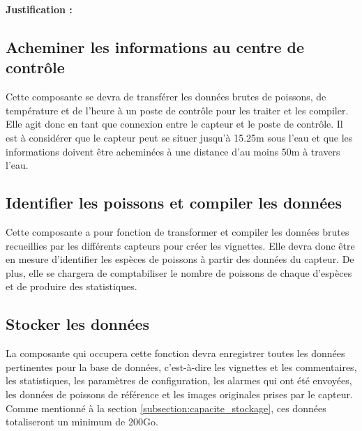  \textbf{Justification :}
 
 \begin{table}[!htb]
\footnotesize
\centering
{}
\caption{Évaluation globale des concepts pour l'alimentation du système}
\label{t:Decision_alimenter}
\end{table}

\subsection{Acheminer les informations au centre de contrôle}
Cette composante se devra de transférer les données brutes de poissons, de température et de l'heure à un poste de contrôle pour les traiter et les compiler. Elle agit donc en tant que connexion entre le capteur et le poste de contrôle. Il est à considérer que le capteur peut se situer jusqu'à 15.25m sous l'eau et que les informations doivent être acheminées à une distance d'au moins 50m à travers l'eau. 


\subsection{Identifier les poissons et compiler les données}
Cette composante a pour fonction de transformer et compiler les données brutes recueillies par les différents capteurs pour créer les vignettes. Elle devra donc être en mesure d'identifier les espèces de poissons à partir des données du capteur. De plus, elle se chargera de comptabiliser le nombre de poissons de chaque d'espèces et de produire des statistiques.


\subsection{Stocker les données}
La composante qui occupera cette fonction devra enregistrer toutes les données pertinentes pour la base de données, c'est-à-dire les vignettes et les commentaires, les statistiques, les paramètres de configuration, les alarmes  qui ont été envoyées, les données de poissons de référence et les images originales prises par le capteur.
Comme mentionné à la section \ref{subsection:capacite_stockage}, ces données totaliseront un minimum de 200Go.

